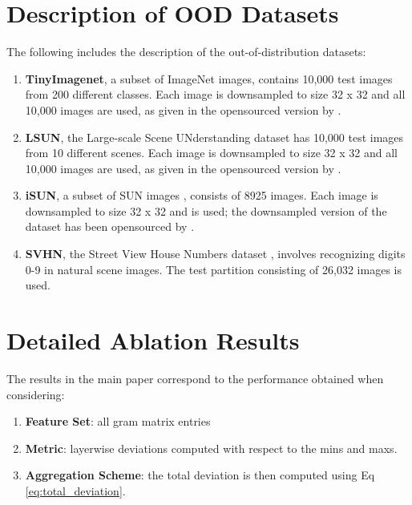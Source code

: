 \documentclass{article}
\begin{document}
\section{Description of OOD Datasets}
\label{appendix:datasets}
The following includes the description of the out-of-distribution datasets:
\begin{enumerate}[noitemsep,topsep=2pt,parsep=5pt,partopsep=0pt]
    \item \textbf{TinyImagenet}, a subset of ImageNet \citep{imagenet} images, contains 10,000 test images from 200 different classes. Each image is downsampled to size 32 x 32 and all 10,000 images are used, as given in the opensourced version by \cite{liang2017enhancing}.
    \item \textbf{LSUN}, the Large-scale Scene UNderstanding dataset \citep{lsun} has 10,000 test images from 10 different scenes. Each image is downsampled to size 32 x 32 and all 10,000 images are used, as given in the opensourced version by \cite{liang2017enhancing}.
    \item \textbf{iSUN}, a subset of SUN images \citep{sun}, consists of 8925 images. Each image is downsampled to size 32 x 32 and is used; the downsampled version of the dataset has been opensourced by \cite{liang2017enhancing}.
    \item \textbf{SVHN}, the Street View House Numbers dataset \citep{svhn}, involves recognizing digits 0-9 in natural scene images. The test partition consisting of 26,032 images is used.
\end{enumerate}

\section{Detailed Ablation Results}
\label{appendix:ablation_results}
The results in the main paper correspond to the performance obtained when considering:
\begin{enumerate}
    \item \textbf{Feature Set}: all gram matrix entries
    \item \textbf{Metric}: layerwise deviations computed with respect to the mins and maxs.
    \item \textbf{Aggregation Scheme}: the total deviation is then computed using Eq \ref{eq:total_deviation}.
\end{enumerate}
\end{document}

